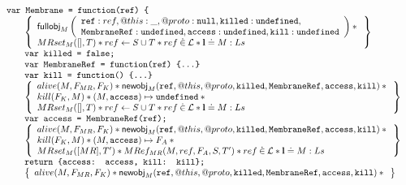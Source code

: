 \documentclass[a4paper,notitlepage]{report}
\begin{document}
\begin{figure}
  \[
    \begin{array}{l}
      \tjs{var Membrane = function(ref) \{} \\
        \indblock{
          \logic{
            \fullobj_M \args{
              \js{ref}: ref, @this: \_, @proto: \nil, \js{killed}: \und, \\
              \js{MembraneRef}: \und, \js{access}: \und, \js{kill}: \und
            } \sep {} \\
            MRset_M([], T) \sep
            ref \bp S \cup T \sep
            ref \dotin \loc \sep
            \ls \doteq M:Ls
          } \\
          \tjs{var killed = false;} \\
          \tjs{var MembraneRef = function(ref) \{...\}} \\
          \tjs{var kill = function() \{...\}} \\
          \logic{
            alive(M, F_{MR}, F_K) \sep
            \newobj_M(\js{ref},@this,@proto,\js{killed},\js{MembraneRef},
                   \js{access},\js{kill}) \sep {} \\

            kill(F_K,M) \sep
            (M,\js{access}) \pointsto \und \sep {} \\

            MRset_M([], T) \sep
            ref \bp S \cup T \sep
            ref \dotin \loc \sep
            \ls \doteq M:Ls
          } \\
          \tjs{var access = MembraneRef(ref);} \\
          \logic{
            alive(M, F_{MR}, F_K) \sep
            \newobj_M(\js{ref},@this,@proto,\js{killed},\js{MembraneRef},
                   \js{access},\js{kill}) \sep {} \\

            kill(F_K,M) \sep
            (M,\js{access}) \pointsto F_A \sep {} \\

            MRset_M([MR], T') \sep
            MRef_{MR}(M,ref,F_A,S,T') \sep
            ref \dotin \loc \sep
            \ls \doteq M:Ls
          } \\
          \tjs{return \{access: access, kill: kill\};} \\
          \logic{
            alive(M, F_{MR}, F_K) \sep
            \newobj_M(\js{ref},@this,@proto,\js{killed},\js{MembraneRef},
                   \js{access},\js{kill}) \sep {} \\

}}
\end{array}\]
\end{figure}
\end{document}
